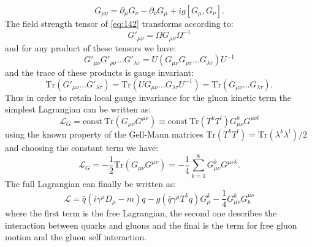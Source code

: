 \begin{equation}
  \label{eq:142}
  G_{\mu\nu} = \partial_\mu G_\nu - \partial_\nu G_\mu + ig \left[ G_\mu, G_\nu \right].
\end{equation}
The field strength tensor of \cref{eq:142} transforms according to:
\begin{equation}
  \label{eq:144}
  G'_{\mu\nu} = \Omega G_{\mu\nu} \Omega^{-1}
\end{equation}
and for any product of these tensors we have:
\begin{equation}
  \label{eq:145}
  G'_{\mu\nu} G'_{\rho \sigma} \dots G'_{\lambda \tau} = U \left( G_{\mu\nu}
    G_{\rho \sigma} \dots G_{\lambda \tau} \right) U^{-1}
\end{equation}
and the trace of these products is gauge invariant:
\begin{equation}
  \label{eq:146}
  \mathrm{Tr}(G'_{\mu\nu} \dots G'_{\lambda \tau}) = \mathrm{Tr}(UG_{\mu\nu}
  \dots G_{\lambda \tau}U^{-1}) = \mathrm{Tr}(G_{\mu\nu} \dots G_{\lambda \tau}).
\end{equation}
Thus in order to retain local gauge invariance for the gluon kinetic term the
simplest Lagrangian can be written as:
\begin{equation}
  \label{eq:143}
  \mathcal{L}_G = \mathrm{const~Tr}(G_{\mu\nu} G^{\mu\nu}) \equiv
  \mathrm{const~}\mathrm{Tr}(T^k T^l) G_{\mu\nu}^k G^{\mu\nu l}
\end{equation}
using the known property of the Gell-Mann matrices $\mathrm{Tr}(T^k T^l) =
\mathrm{Tr}(\lambda^k \lambda^l)/2$ and choosing the constant term we have:
\begin{equation}
  \label{eq:147}
  \mathcal{L}_G = - \frac{1}{2} \mathrm{Tr}(G_{\mu\nu}G^{\mu\nu}) = -
  \frac{1}{4} \sum_{k = 1}^8 G_{\mu\nu}^k G^{\mu\nu k}.
\end{equation}
The full Lagrangian can finally be written as:
\begin{equation}
  \label{eq:148}
  \mathcal{L} = \bar{q} \left( i \gamma^\mu D_\mu - m \right) q - g \left(
    \bar{q} \gamma^\mu T^k q \right) G_\mu^k - \frac{1}{4}G_{\mu\nu}^k G_k^{\mu\nu}
\end{equation}
where the first term is the free Lagrangian, the second one describes the
interaction between quarks and gluons and the final is the term for free gluon
motion and the gluon self interaction.
